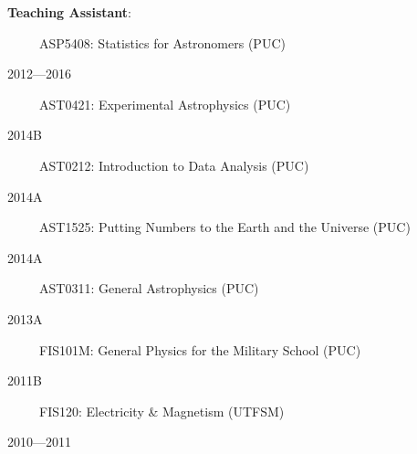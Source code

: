 \documentclass[12pt, a4paper]{article} %
\begin{document}
\begin{flushleft}%
  \setlength{\leftskip}{0.2cm}%
\textbf{Teaching Assistant}:
\end{flushleft}
\begin{minipage}[t]{0.6\textwidth}
\ \ \ \ \ ASP5408: Statistics for Astronomers (PUC)
\end{minipage}
\begin{minipage}[t]{0.4\textwidth}
\hfill 2012---2016
\end{minipage}
\begin{minipage}[t]{0.7\textwidth}
\ \ \ \ \ AST0421: Experimental Astrophysics (PUC)
\end{minipage}
\begin{minipage}[t]{0.3\textwidth}
\hfill 2014B
\end{minipage}
\begin{minipage}[t]{0.7\textwidth}
\ \ \ \ \ AST0212: Introduction to Data Analysis (PUC)
\end{minipage}
\begin{minipage}[t]{0.3\textwidth}
\hfill 2014A
\end{minipage}
\begin{minipage}[t]{0.7\textwidth}
\ \ \ \ \ AST1525: Putting Numbers to the Earth and the Universe (PUC)
\end{minipage}
\begin{minipage}[t]{0.3\textwidth}
\hfill 2014A
\end{minipage}
\begin{minipage}[t]{0.7\textwidth}
\ \ \ \ \ AST0311: General Astrophysics (PUC)
\end{minipage}
\begin{minipage}[t]{0.3\textwidth}
\hfill 2013A
\end{minipage}
\begin{minipage}[t]{0.7\textwidth}
\ \ \ \ \ FIS101M: General Physics for the Military School (PUC)
\end{minipage}
\begin{minipage}[t]{0.3\textwidth}
\hfill 2011B
\end{minipage}
\begin{minipage}[t]{0.7\textwidth}
\ \ \ \ \ FIS120: Electricity \& Magnetism (UTFSM)
\end{minipage}
\begin{minipage}[t]{0.3\textwidth}
\hfill 2010---2011
\end{minipage}
\end{document}
